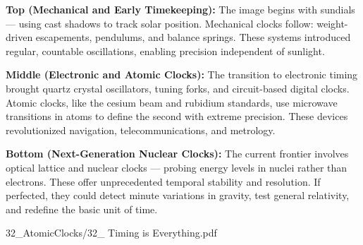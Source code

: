 \begin{SideNotePage}{
  \textbf{Top (Mechanical and Early Timekeeping):}  
  The image begins with sundials — using cast shadows to track solar position. Mechanical clocks follow: weight-driven escapements, pendulums, and balance springs. These systems introduced regular, countable oscillations, enabling precision independent of sunlight. \par

  \textbf{Middle (Electronic and Atomic Clocks):}  
  The transition to electronic timing brought quartz crystal oscillators, tuning forks, and circuit-based digital clocks. Atomic clocks, like the cesium beam and rubidium standards, use microwave transitions in atoms to define the second with extreme precision. These devices revolutionized navigation, telecommunications, and metrology. \par

  \textbf{Bottom (Next-Generation Nuclear Clocks):}  
  The current frontier involves optical lattice and nuclear clocks — probing energy levels in nuclei rather than electrons. These offer unprecedented temporal stability and resolution. If perfected, they could detect minute variations in gravity, test general relativity, and redefine the basic unit of time. \par
}{32_AtomicClocks/32_ Timing is Everything.pdf}
\end{SideNotePage}
